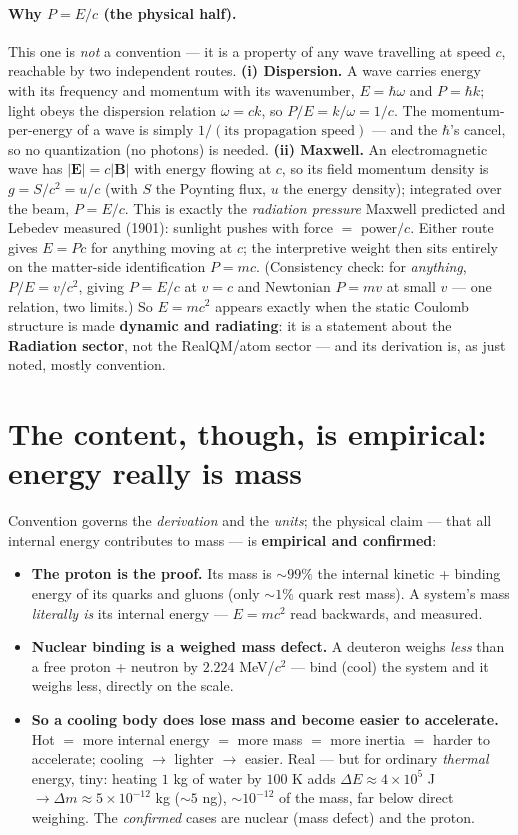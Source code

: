 \documentclass[11pt]{article}
\begin{document}
\paragraph{Why $P=E/c$ (the physical half).} This one is \emph{not} a convention --- it is a property of any
wave travelling at speed $c$, reachable by two independent routes. \textbf{(i) Dispersion.} A wave carries
energy with its frequency and momentum with its wavenumber, $E=\hbar\omega$ and $P=\hbar k$; light obeys the
dispersion relation $\omega=ck$, so $P/E=k/\omega=1/c$. The momentum-per-energy of a wave is simply
$1/(\text{its propagation speed})$ --- and the $\hbar$'s cancel, so no quantization (no photons) is needed.
\textbf{(ii) Maxwell.} An electromagnetic wave has $|\mathbf E|=c|\mathbf B|$ with energy flowing at $c$, so
its field momentum density is $g=S/c^2=u/c$ (with $S$ the Poynting flux, $u$ the energy density); integrated
over the beam, $P=E/c$. This is exactly the \emph{radiation pressure} Maxwell predicted and Lebedev measured
(1901): sunlight pushes with force $=$ power$/c$. Either route gives $E=Pc$ for anything moving at $c$; the
interpretive weight then sits entirely on the matter-side identification $P=mc$. (Consistency check: for
\emph{anything}, $P/E=v/c^2$, giving $P=E/c$ at $v=c$ and Newtonian $P=mv$ at small $v$ --- one relation, two
limits.)
So $E=mc^2$ appears exactly when the static Coulomb structure is made \textbf{dynamic and radiating}: it is a
statement about the \textbf{Radiation sector}, not the RealQM/atom sector --- and its derivation is, as just
noted, mostly convention.

\section{The content, though, is empirical: energy really is mass}
Convention governs the \emph{derivation} and the \emph{units}; the physical claim --- that all internal energy
contributes to mass --- is \textbf{empirical and confirmed}:
\begin{itemize}
\item \textbf{The proton is the proof.} Its mass is ${\sim}99\%$ the internal kinetic + binding energy of its
quarks and gluons (only ${\sim}1\%$ quark rest mass). A system's mass \emph{literally is} its internal energy
--- $E=mc^2$ read backwards, and measured.
\item \textbf{Nuclear binding is a weighed mass defect.} A deuteron weighs \emph{less} than a free proton +
neutron by $2.224$ MeV/$c^2$ --- bind (cool) the system and it weighs less, directly on the scale.
\item \textbf{So a cooling body does lose mass and become easier to accelerate.} Hot $=$ more internal energy
$=$ more mass $=$ more inertia $=$ harder to accelerate; cooling $\to$ lighter $\to$ easier. Real --- but for
ordinary \emph{thermal} energy, tiny: heating $1$ kg of water by $100$ K adds $\Delta E\approx4\times10^5$ J
$\to \Delta m\approx 5\times10^{-12}$ kg (${\sim}5$ ng), ${\sim}10^{-12}$ of the mass, far below direct
weighing. The \emph{confirmed} cases are nuclear (mass defect) and the proton.
\end{itemize}
\end{document}
